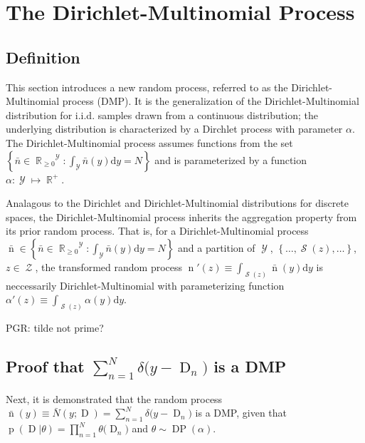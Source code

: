 \documentclass[12pt]{report}
\DeclareMathOperator{\Drm}{\mathrm{D}}
\DeclareMathOperator{\nrm}{\mathrm{n}}
\DeclareMathOperator{\prm}{\mathrm{p}}
\DeclareMathOperator{\Ycal}{\mathcal{Y}}
\DeclareMathOperator{\Zcal}{\mathcal{Z}}
\DeclareMathOperator{\Scal}{\mathcal{S}}
\DeclareMathOperator{\Rbb}{\mathbb{R}}
\DeclareMathOperator{\DP}{\mathrm{DP}}
\begin{document}
\section{The Dirichlet-Multinomial Process} \label{app:DMP}

\subsection{Definition}

This section introduces a new random process, referred to as the Dirichlet-Multinomial process (DMP). It is the generalization of the Dirichlet-Multinomial distribution for i.i.d. samples drawn from a continuous distribution; the underlying distribution is characterized by a Dirchlet process with parameter $\alpha$. The Dirichlet-Multinomial process assumes functions from the set $\left\{ \bar{n} \in {\Rbb_{\geq 0}}^{\Ycal} : \int_{\Ycal} \bar{n}(y) \mathrm{d} y = N \right\}$ and is parameterized by a function $\alpha : \Ycal \mapsto \Rbb^+$.

Analagous to the Dirichlet and Dirichlet-Multinomial distributions for discrete spaces, the Dirichlet-Multinomial process inherits the aggregation property from its prior random process. That is, for a Dirichlet-Multinomial process $\bar{\nrm} \in \left\{ \bar{n} \in {\Rbb_{\geq 0}}^{\Ycal} : \int_{\Ycal} \bar{n}(y) \mathrm{d} y = N \right\}$ and a partition of $\Ycal$, $\left\{ \ldots,\Scal(z),\ldots \right\}$, $z \in \Zcal$, the transformed random process $\nrm'(z) \equiv \int_{\Scal(z)} \bar{\nrm}(y) \mathrm{d} y$ is neccessarily Dirichlet-Multinomial with parameterizing function $\alpha'(z) \equiv \int_{\Scal(z)} \alpha(y) \mathrm{d} y$.

PGR: tilde not prime?

\subsection{Proof that $\sum_{n=1}^N \delta\big( y-\Drm_n \big)$ is a DMP}

Next, it is demonstrated that the random process $\bar{\nrm}(y) \equiv \bar{N}(y;\Drm) = \sum_{n=1}^N \delta\big( y-\Drm_n \big)$ is a DMP, given that $\prm(\Drm|\theta) = \prod_{n=1}^N \theta\big( \Drm_n \big)$ and $\theta \sim \DP(\alpha)$. 
\end{document}
